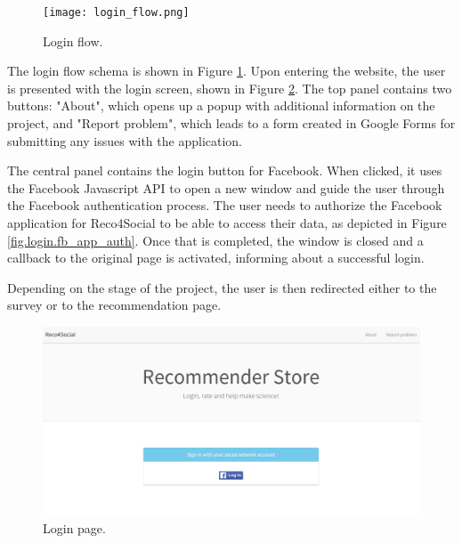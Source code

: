 \documentclass[12pt]{report}
\begin{document}
\begin{figure}[!h]
\centering
\texttt{[image: login\_flow.png]} 
\caption[Login flow.]{Login flow.}
\label{fig.login_flow}
\end{figure}

The login flow schema is shown in Figure \ref{fig.login_flow}. Upon entering the website, the user is presented with the login screen, shown in Figure \ref{fig.login}. The top panel contains two buttons: "About", which opens up a popup with additional information on the project, and "Report problem", which leads to a form created in Google Forms for submitting any issues with the application.

The central panel contains the login button for Facebook. When clicked, it uses the Facebook Javascript API to open a new window and guide the user through the Facebook authentication process. The user needs to authorize the Facebook application for Reco4Social to be able to access their data, as depicted in Figure \ref{fig.login.fb_app_auth}. Once that is completed, the window is closed and a callback to the original page is activated, informing about a successful login.

Depending on the stage of the project, the user is then redirected either to the survey or to the recommendation page. 

\begin{figure}
\centering
\includegraphics[width=\textwidth]{reco4_login.png} 
\caption[Login page.]{Login page.}
\label{fig.login}
\end{figure}
\end{document}
